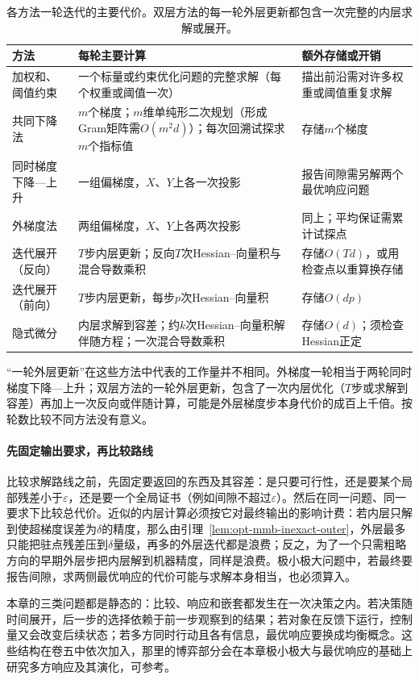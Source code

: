 \begin{table}[!htbp]
  \centering
  \small
  \begin{tabularx}{\linewidth}{@{}p{30mm}XX@{}}
    \toprule
    方法 & 每轮主要计算 & 额外存储或开销 \\
    \midrule
    加权和、阈值约束 & 一个标量或约束优化问题的完整求解（每个权重或阈值一次） & 描出前沿需对许多权重或阈值重复求解 \\
    共同下降法 & $m$个梯度；$m$维单纯形二次规划（形成Gram矩阵需$O(m^2d)$）；每次回溯试探求$m$个指标值 & 存储$m$个梯度 \\
    同时梯度下降—上升 & 一组偏梯度，$X$、$Y$上各一次投影 & 报告间隙需另解两个最优响应问题 \\
    外梯度法 & 两组偏梯度，$X$、$Y$上各两次投影 & 同上；平均保证需累计试探点 \\
    迭代展开（反向） & $T$步内层更新；反向$T$次Hessian--向量积与混合导数乘积 & 存储$O(Td)$，或用检查点以重算换存储 \\
    迭代展开（前向） & $T$步内层更新，每步$p$次Hessian--向量积 & 存储$O(dp)$ \\
    隐式微分 & 内层求解到容差；约$k$次Hessian--向量积解伴随方程；一次混合导数乘积 & 存储$O(d)$；须检查Hessian正定 \\
    \bottomrule
  \end{tabularx}
  \caption{各方法一轮迭代的主要代价。双层方法的每一轮外层更新都包含一次完整的内层求解或展开。}
  \label{tab:opt-mmb-costs}
\end{table}

“一轮外层更新”在这些方法中代表的工作量并不相同。外梯度一轮相当于两轮同时梯度下降—上升；双层方法的一轮外层更新，包含了一次内层优化（$T$步或求解到容差）再加上一次反向或伴随计算，可能是外层梯度步本身代价的成百上千倍。按轮数比较不同方法没有意义。

\paragraph{先固定输出要求，再比较路线}
比较求解路线之前，先固定要返回的东西及其容差：是只要可行性，还是要某个局部残差小于$\varepsilon$，还是要一个全局证书（例如间隙不超过$\varepsilon$）。然后在同一问题、同一要求下比较总代价。近似的内层计算必须按它对最终输出的影响计费：若内层只解到使超梯度误差为$\delta$的精度，那么由引理~\ref{lem:opt-mmb-inexact-outer}，外层最多只能把驻点残差压到$\delta$量级，再多的外层迭代都是浪费；反之，为了一个只需粗略方向的早期外层步把内层解到机器精度，同样是浪费。极小极大问题中，若最终要报告间隙，求两侧最优响应的代价可能与求解本身相当，也必须算入。

本章的三类问题都是静态的：比较、响应和嵌套都发生在一次决策之内。若决策随时间展开，后一步的选择依赖于前一步观察到的结果；若对象在反馈下运行，控制量又会改变后续状态；若多方同时行动且各有信息，最优响应要换成均衡概念。这些结构在卷五中依次加入，那里的博弈部分会在本章极小极大与最优响应的基础上研究多方响应及其演化，可参考。
